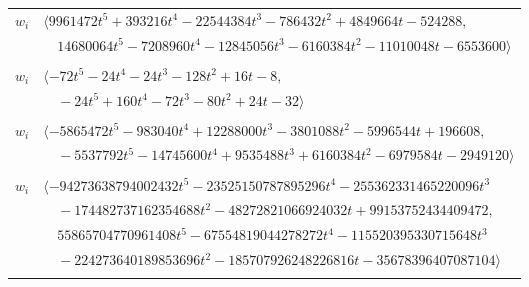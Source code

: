 \documentclass[11pt]{article}
\begin{document}
\begin{longtable}{@{}ll@{}}
$w_i$ & $\langle 9961472t^{5}+393216t^{4}-22544384t^{3}-786432t^{2}+4849664t-524288,$\\
 & $\quad 14680064t^{5}-7208960t^{4}-12845056t^{3}-6160384t^{2}-11010048t-6553600\rangle$\\
\addlinespace[2pt]
\multicolumn{2}{@{}p{0.97\textwidth}@{}}{$i=13$, $D_i=8$, $\rho_{ij}$: $5{:}1, \allowbreak 9{:}1, \allowbreak 16{:}2, \allowbreak 21{:}2, \allowbreak 33{:}1, \allowbreak 50{:}1, \allowbreak 52{:}1, \allowbreak 59{:}2$}\\
$w_i$ & $\langle -72t^{5}-24t^{4}-24t^{3}-128t^{2}+16t-8,$\\
 & $\quad -24t^{5}+160t^{4}-72t^{3}-80t^{2}+24t-32\rangle$\\
\addlinespace[2pt]
\multicolumn{2}{@{}p{0.97\textwidth}@{}}{$i=14$, $D_i=16384$, $\rho_{ij}$: $0{:}2, \allowbreak 6{:}2, \allowbreak 9{:}1, \allowbreak 20{:}1, \allowbreak 22{:}1, \allowbreak 39{:}1, \allowbreak 45{:}1, \allowbreak 50{:}1, \allowbreak 54{:}2, \allowbreak 55{:}2, \allowbreak 62{:}1$}\\
$w_i$ & $\langle -5865472t^{5}-983040t^{4}+12288000t^{3}-3801088t^{2}-5996544t+196608,$\\
 & $\quad -5537792t^{5}-14745600t^{4}+9535488t^{3}+6160384t^{2}-6979584t-2949120\rangle$\\
\addlinespace[2pt]
\multicolumn{2}{@{}p{0.97\textwidth}@{}}{$i=15$, $D_i=68719476736$, $\rho_{ij}$: $3{:}1, \allowbreak 4{:}2, \allowbreak 17{:}2, \allowbreak 18{:}2, \allowbreak 19{:}1, \allowbreak 22{:}1, \allowbreak 27{:}2, \allowbreak 28{:}2, \allowbreak 34{:}1, \allowbreak 35{:}2, \allowbreak 38{:}1, \allowbreak 39{:}2, \allowbreak 41{:}2, \allowbreak 44{:}1, \allowbreak 48{:}1, \allowbreak 52{:}2, \allowbreak 54{:}2, \allowbreak 55{:}1, \allowbreak 70{:}2, \allowbreak 71{:}1$}\\
$w_i$ & $\langle -94273638794002432t^{5}-23525150787895296t^{4}-255362331465220096t^{3}$\\
 & $\quad -174482737162354688t^{2}-48272821066924032t+99153752434409472,$\\
 & $\quad 55865704770961408t^{5}-67554819044278272t^{4}-115520395330715648t^{3}$\\
 & $\quad -224273640189853696t^{2}-185707926248226816t-35678396407087104\rangle$\\
\addlinespace[2pt]
\multicolumn{2}{@{}p{0.97\textwidth}@{}}{$i=16$, $D_i=16384$, $\rho_{ij}$: $6{:}1, \allowbreak 7{:}2, \allowbreak 13{:}1, \allowbreak 17{:}1, \allowbreak 18{:}1, \allowbreak 31{:}1, \allowbreak 41{:}1, \allowbreak 48{:}2, \allowbreak 58{:}2$}\\

\end{longtable}
\end{document}
